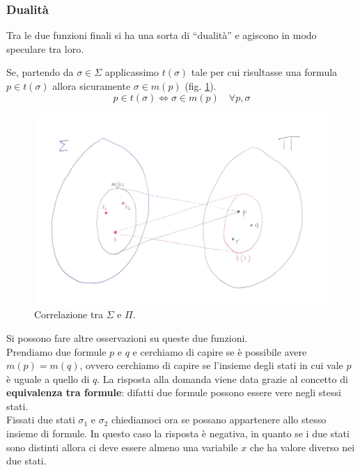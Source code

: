 				      				\subsubsection{Dualità}
				      				Tra le due funzioni finali si ha una sorta di ``dualità'' e agiscono in modo
				      				speculare tra loro.
				      				\begin{definizione}
				      				     Se, partendo da $\sigma \in \Sigma$ applicassimo $t(\sigma)$ tale per cui risultasse una formula $p \in t(\sigma)$ allora sicuramente $ \sigma \in m(p)$ (fig. \ref{fig:SigmaAndPi}).
				      				     \[p \in t(\sigma) \iff \sigma \in m(p) \,\,\,\,\,\, \forall p, \sigma \]
				      				\end{definizione}
				      				\begin{figure}[H]
                                        \centering \includegraphics[width=1\textwidth]{img/VENN.png}
                                        \caption{Correlazione tra $\Sigma$ e $\Pi$.}
                                        \label{fig:SigmaAndPi}
                                    \end{figure}
				      				Si possono fare altre osservazioni su queste due funzioni. \\
				      				Prendiamo due formule $p$ e $q$ e cerchiamo di capire se è possibile avere
				      				$m(p)=m(q)$, ovvero cerchiamo di capire se l'insieme degli stati in cui vale $p$ è uguale a quello di $q$. La risposta alla domanda viene data grazie al concetto di \textbf{equivalenza
				      					tra formule}: difatti due formule possono essere vere negli stessi stati. \\ 
				      					Fissati due stati $\sigma_1$ e $\sigma_2$ chiediamoci ora se possano
				      				appartenere allo stesso insieme di formule. In questo caso la risposta è
				      				negativa, in quanto se i due stati sono distinti allora ci deve essere almeno
				      				una variabile $x$ che ha valore diverso nei due stati.\\
